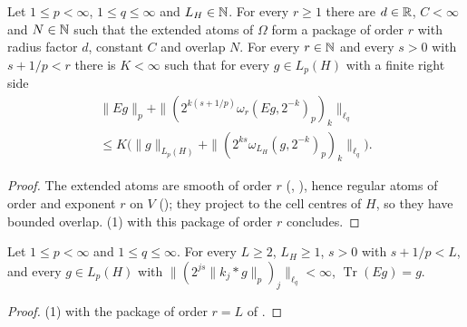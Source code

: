 \begin{theorem}
\label{thm:flat-extension-bounded}
\leanok
{}
Let $1 \leq p < \infty$, $1 \leq q \leq \infty$ and $L_H \in \mathbb{N}$. For every $r \geq 1$ there are
$d \in \mathbb{R}$, $C < \infty$ and $N \in \mathbb{N}$ such that the extended atoms of $\Omega$ form a package of
order $r$ with radius factor $d$, constant $C$ and overlap $N$. For every $r \in \mathbb{N}$ and every
$s > 0$ with $s + 1/p < r$ there is $K < \infty$ such that for every $g \in L_p(H)$ with a finite
right side
\begin{multline*}
  \|E g\|_p + \|(2^{k(s + 1/p)} \omega_r(E g, 2^{-k})_p)_k\|_{\ell_q} \\ \leq
  K \bigl(\|g\|_{L_p(H)} + \|(2^{ks} \omega_{L_H}(g, 2^{-k})_p)_k\|_{\ell_q}\bigr) .
\end{multline*}
\end{theorem}

\begin{proof}
\leanok
The extended atoms are smooth of order $r$ (,
), hence regular atoms of order and exponent $r$ on $V$
(); they project to the cell centres of $H$, so they have bounded
overlap.  (1) with this package of order $r$ concludes.
\end{proof}

\begin{theorem}
\label{thm:trace-flat-extension}
\leanok
{}
Let $1 \leq p < \infty$ and $1 \leq q \leq \infty$. For every $L \geq 2$, $L_H \geq 1$, $s > 0$
with $s + 1/p < L$, and every $g \in L_p(H)$ with
$\|(2^{js} \|k_j * g\|_p)_j\|_{\ell_q} < \infty$, $\operatorname{Tr}(E g) = g$.
\end{theorem}

\begin{proof}
\leanok
{} (1) with the package of order $r = L$ of
.
\end{proof}


